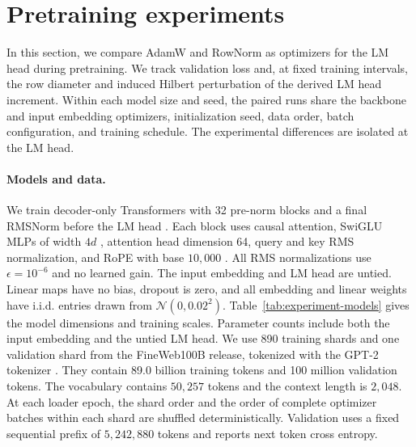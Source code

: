 \documentclass[anon]{opt2026} %
\begin{document}
\section{Pretraining experiments}
\label{app:experiments}

In this section, we compare AdamW and RowNorm as optimizers for the LM head during pretraining. We track validation loss and, at fixed training intervals,
the row diameter and induced Hilbert perturbation of the derived LM
head increment. Within each model size and seed, the paired runs
share the backbone and input embedding optimizers, initialization seed, data
order, batch configuration, and training schedule. The experimental differences are isolated at the LM head.


\paragraph{Models and data.}
We train decoder-only Transformers \citep{vaswani2023attentionneed} with 32
pre-norm blocks and a final RMSNorm before the LM head \citep{zhang2019rootmeansquarelayer}.
Each block uses causal attention, SwiGLU MLPs of
width $4d$ \citep{shazeer2020gluvariantsimprovetransformer}, attention head dimension 64, query and key
RMS normalization, and RoPE with base $10{,}000$
\citep{su2023roformerenhancedtransformerrotary}.
All RMS normalizations use $\epsilon=10^{-6}$ and no
learned gain. The input embedding and LM head are untied. Linear maps have no
bias, dropout is zero, and all embedding and linear weights have i.i.d. entries
drawn from $\mathcal N(0,0.02^2)$. Table~\ref{tab:experiment-models} gives the
model dimensions and training scales. Parameter counts include both the input
embedding and the untied LM head.
We use 890 training shards and one validation shard from the FineWeb100B
release, tokenized with the GPT-2 tokenizer \citep{radford2019language, penedo2024finewebdatasetsdecantingweb}. They contain 89.0 billion
training tokens and 100 million validation tokens. The vocabulary contains
$50{,}257$ tokens and the context length is $2{,}048$. At
each loader epoch, the shard order and the order of complete optimizer batches
within each shard are shuffled deterministically.
Validation uses a fixed sequential prefix
of $5{,}242{,}880$ tokens and reports next token cross entropy.
\end{document}

